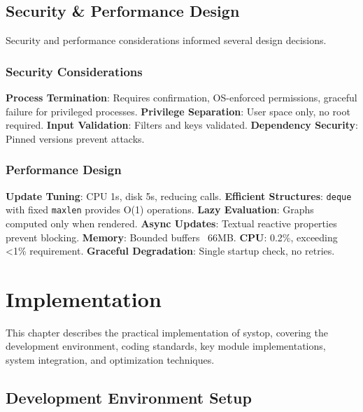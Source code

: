 \documentclass[12pt,a4paper,oneside]{report}
\begin{document}
\section{Security \& Performance Design}
\label{sec:security-performance}

Security and performance considerations informed several design decisions.

\subsection{Security Considerations}

\textbf{Process Termination}: Requires confirmation, OS-enforced permissions, graceful failure for privileged processes. \textbf{Privilege Separation}: User space only, no root required. \textbf{Input Validation}: Filters and keys validated. \textbf{Dependency Security}: Pinned versions prevent attacks.

\subsection{Performance Design}

\textbf{Update Tuning}: CPU 1s, disk 5s, reducing calls. \textbf{Efficient Structures}: \texttt{deque} with fixed \texttt{maxlen} provides O(1) operations. \textbf{Lazy Evaluation}: Graphs computed only when rendered. \textbf{Async Updates}: Textual reactive properties prevent blocking. \textbf{Memory}: Bounded buffers ~66MB. \textbf{CPU}: 0.2\%, exceeding <1\% requirement. \textbf{Graceful Degradation}: Single startup check, no retries.

\chapter{Implementation}
\label{chap:implementation}

This chapter describes the practical implementation of systop, covering the development environment, coding standards, key module implementations, system integration, and optimization techniques.

\section{Development Environment Setup}
\label{sec:dev-environment}
\end{document}
